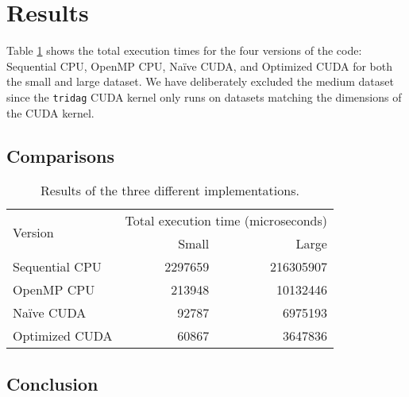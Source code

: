 \documentclass[12pt, oneside]{article}
\begin{document}
\section{Results}
Table \ref{fig:results} shows the total execution times for the four versions of the code: Sequential CPU, OpenMP CPU, Na\"ive CUDA, and Optimized CUDA for both the small and large dataset. We have deliberately excluded the medium dataset since the \texttt{tridag} CUDA kernel only runs on datasets matching the dimensions of the CUDA kernel.
\subsection{Comparisons}
\begin{table}[h]
\centering
\begin{tabular}{l r r}
\toprule
\multirow{2}{*}{Version}        & \multicolumn{2}{c}{Total execution time (microseconds)} \\
                    & Small     & Large \\
\midrule
Sequential CPU      & 2297659   & 216305907 \\
OpenMP CPU          & 213948    & 10132446  \\
Na\"ive CUDA        & 92787     & 6975193   \\
Optimized CUDA      & 60867     & 3647836   \\
\bottomrule
\end{tabular}
\caption{\label{fig:results} Results of the three different implementations.}
\end{table}
\subsection{Conclusion}


\end{document}
